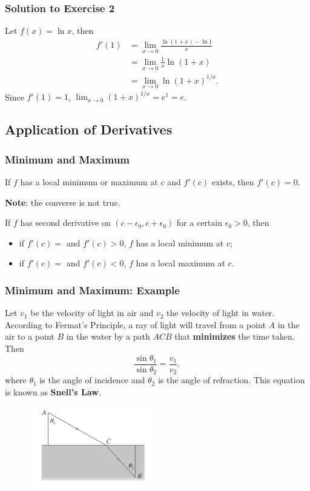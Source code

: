\documentclass{beamer}
\begin{document}
\begin{frame}
\frametitle{Solution to Exercise 2}
Let $f(x) = \ln x$, then
\begin{equation*}
\begin{aligned}
f'(1) &= \lim_{x \rightarrow 0} \frac{\ln (1+x) - \ln 1}{x} \\
&= \lim_{x \rightarrow 0} \frac{1}{x} \ln (1+x) \\
&= \lim_{x \rightarrow 0} \ln (1+x)^{1/x}.
\end{aligned}
\end{equation*}
Since $f'(1)=1$, $\lim_{x \rightarrow 0} (1+x)^{1/x} = e^{1} = e$.
\end{frame}


\subsection{Application of Derivatives}

\begin{frame}
\frametitle{Minimum and Maximum}
\begin{theorem}
If $f$ has a local minimum or maximum at $c$ and $f'(c)$ exists, then $f'(c)=0$.
\end{theorem}
\textbf{Note}: the converse is not true.
\vspace*{0.15in}
\begin{theorem}
If $f$ has second derivative on $(c-\epsilon_0,c+\epsilon_0)$ for a certain $\epsilon_0 > 0$, then
\begin{itemize}
\item if $f'(c)=$ and $f'(c) > 0$, $f$ has a local minimum at $c$;
\item if $f'(c)=$ and $f'(c) < 0$, $f$ has a local maximum at $c$.
\end{itemize}
\end{theorem}
\end{frame}

\begin{frame}
\frametitle{Minimum and Maximum: Example}
Let $v_1$ be the velocity of light in air and $v_2$ the velocity of light in water. According to Fermat's Principle, a ray of light will travel from a point $A$ in the air to a point $B$ in the water by a path $ACB$ that \textbf{minimizes} the time taken. Then
$$
\frac{\sin \theta_1}{\sin \theta_2} = \frac{v_1}{v_2},
$$
where $\theta_1$ is the angle of incidence and $\theta_2$ is the angle of refraction. This equation is known as \textbf{Snell's Law}.
\begin{figure}
\centering
\includegraphics[width=5.5cm]{Snells-Law.png}
\end{figure}

\end{frame}
\end{document}
